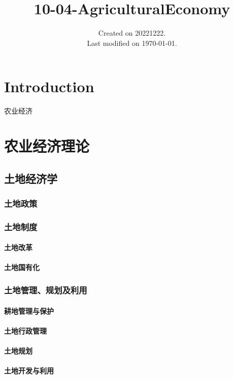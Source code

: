 \documentclass[UTF8]{../../RepresentationUniverse}
\begin{document}
\title{10-04-AgriculturalEconomy}
\date{Created on 20221222.\\   Last modified on \today.}
\maketitle
\tableofcontents


\chapter{Introduction}

农业经济 


\chapter{农业经济理论}
\section{土地经济学}
    \subsection{土地政策}
    \subsection{土地制度}
        \subsubsection{土地改革}
        \subsubsection{土地国有化}
    \subsection{土地管理、规划及利用}
        \subsubsection{耕地管理与保护}
        \subsubsection{土地行政管理}
        \subsubsection{土地规划}
        \subsubsection{土地开发与利用}
\end{document}
